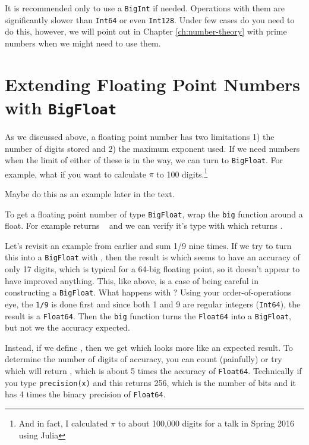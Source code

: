 It is recommended only to use a \texttt{BigInt} if needed.  Operations with them are significantly slower than \texttt{Int64} or even \texttt{Int128}.  Under few cases do you need to do this, however, we will point out in Chapter \ref{ch:number-theory} with prime numbers when we might need to use them.  


\section{Extending Floating Point Numbers with \texttt{BigFloat}}

As we discussed above, a floating point number has two limitations 1) the number of digits stored and 2) the maximum exponent used.  If we need numbers when the limit of either of these is in the way, we can turn to \texttt{BigFloat}.  For example,
what if you want to calculate $\pi$ to 100 digits.\footnote{And in
  fact, I calculated $\pi$ to about 100,000 digits for a talk in
  Spring 2016 using Julia}
  

{\color{red} Maybe do this as an example later in the text}.  
  
To get a floating point number of type \texttt{BigFloat}, wrap the \texttt{big} function around a float.  For example  returns \printpythontex[verb]~ and we can verify it's type with  which returns  \printpythontex[verb]. 

Let's revisit an example from earlier and sum 1/9 nine times.  If we try to turn this into a \texttt{BigFloat} with , then the result is
 \printpythontex[verbatim]
%
which seems to have an accuracy of only 17 digits, which is typical for a 64-big floating point, so it doesn't appear to have improved anything.  This, like above, is a case of being careful in constructing a \texttt{BigFloat}.  What happens with ? Using your order-of-operations eye, the \verb!1/9! is done first and since both 1 and 9 are regular integers (\texttt{Int64}), the result is a \texttt{Float64}.  Then the \verb!big! function turns the \texttt{Float64} into a \texttt{BigFloat}, but not we the accuracy expected. 

Instead, if we define , then we get
 \printpythontex[verbatim][breakanywhere=true]
%
which looks more like an expected result. To determine the number of digits of accuracy, you can count (painfully) or try  which will return \printpythontex[verb], which is about 5 times the accuracy of \texttt{Float64}. Technically if you type \texttt{precision(x)} and this returns 256, which is the number of bits and it has 4 times the binary precision of \texttt{Float64}.

